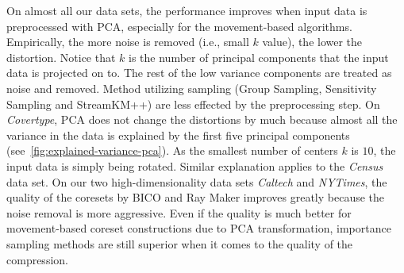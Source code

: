 On almost all our data sets, the performance improves when input data is preprocessed with PCA, especially for the movement-based algorithms. Empirically, the more noise is removed (i.e., small $k$ value), the lower the distortion. Notice that $k$ is the number of principal components that the input data is projected on to. The rest of the low variance components are treated as noise and removed. Method utilizing sampling (Group Sampling, Sensitivity Sampling and StreamKM++) are less effected by the preprocessing step. On \textit{Covertype}, PCA does not change the distortions by much because almost all the variance in the data is explained by the first five principal components (see~\cref{fig:explained-variance-pca}). As the smallest number of centers $k$ is $10$, the input data is simply being rotated. Similar explanation applies to the \textit{Census} data set. On our two high-dimensionality data sets \textit{Caltech} and \textit{NYTimes}, the quality of the coresets by BICO and Ray Maker improves greatly because the noise removal is more aggressive. Even if the quality is much better for movement-based coreset constructions due to PCA transformation, importance sampling methods are still superior when it comes to the quality of the compression. 

